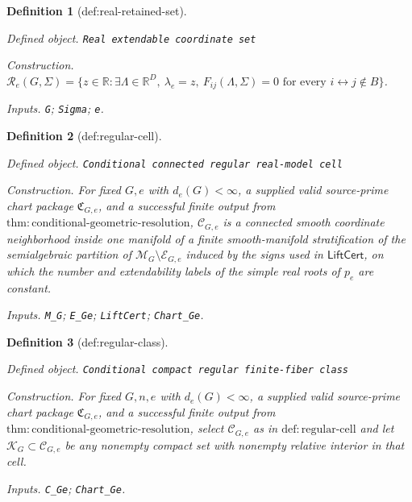 \documentclass{article}
\newtheorem{definition}{Definition}
\begin{document}
\begin{definition}[def:real-retained-set]\label{def:real-retained-set}
\par\smallskip\noindent\emph{Defined object.} \texttt{Real extendable coordinate set}
\par\smallskip\noindent\emph{Construction.} \(\mathcal R_e(G,\Sigma)=\{z\in\mathbb R:\exists\Lambda\in\mathbb R^D,\ \lambda_e=z,\ F_{ij}(\Lambda,\Sigma)=0\text{ for every }i\leftrightarrow j\notin B\}\).
\par\smallskip\noindent\emph{Inputs.} \texttt{G}; \texttt{Sigma}; \texttt{e}.
\end{definition}

\begin{definition}[def:regular-cell]\label{def:regular-cell}
\par\smallskip\noindent\emph{Defined object.} \texttt{Conditional connected regular real-\allowbreak{}model cell}
\par\smallskip\noindent\emph{Construction.} For fixed \(G,e\) with \(d_e(G)<\infty\), a supplied valid source-prime chart package \(\mathfrak C_{G,e}\), and a successful finite output from \(\mathrm{thm:conditional\mbox{-}geometric\mbox{-}resolution}\), \(\mathcal C_{G,e}\) is a connected smooth coordinate neighborhood inside one manifold of a finite smooth-manifold stratification of the semialgebraic partition of \(\mathcal M_G\setminus\mathcal E_{G,e}\) induced by the signs used in \(\mathsf{LiftCert}\), on which the number and extendability labels of the simple real roots of \(p_e\) are constant.
\par\smallskip\noindent\emph{Inputs.} \texttt{M\_\allowbreak{}G}; \texttt{E\_\allowbreak{}Ge}; \texttt{LiftCert}; \texttt{Chart\_\allowbreak{}Ge}.
\end{definition}

\begin{definition}[def:regular-class]\label{def:regular-class}
\par\smallskip\noindent\emph{Defined object.} \texttt{Conditional compact regular finite-\allowbreak{}fiber class}
\par\smallskip\noindent\emph{Construction.} For fixed \(G,n,e\) with \(d_e(G)<\infty\), a supplied valid source-prime chart package \(\mathfrak C_{G,e}\), and a successful finite output from \(\mathrm{thm:conditional\mbox{-}geometric\mbox{-}resolution}\), select \(\mathcal C_{G,e}\) as in \(\mathrm{def:regular\mbox{-}cell}\) and let \(\mathcal K_G\subset\mathcal C_{G,e}\) be any nonempty compact set with nonempty relative interior in that cell.
\par\smallskip\noindent\emph{Inputs.} \texttt{C\_\allowbreak{}Ge}; \texttt{Chart\_\allowbreak{}Ge}.
\end{definition}
\end{document}
